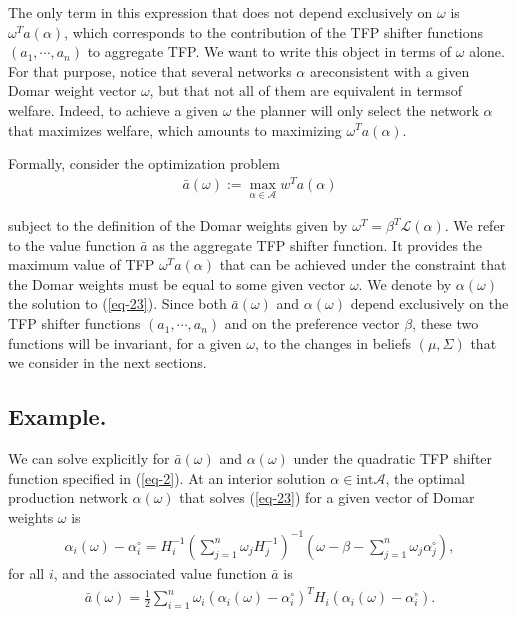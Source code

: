 \documentclass[11pt]{article}
\theoremstyle{definition}
\begin{document}
	The only term in this expression that does not depend exclusively on $\omega$ is $\omega^Ta(\alpha)$, which corresponds to the contribution of the TFP shifter functions $(a_1,\cdots,a_n)$ to aggregate TFP. We want to write this object in terms of $\omega$ alone. For that purpose, notice that several networks $\alpha$ areconsistent with a given Domar weight vector $\omega$, but that not all of them are equivalent in termsof welfare. Indeed, to achieve a given $\omega$ the planner will only select the network $\alpha$ that maximizes welfare, which amounts to maximizing $\omega^Ta(\alpha)$.
	
	Formally, consider the optimization problem
	\begin{align}
		\bar{a}(\omega) := \max\limits_{\alpha\in\mathcal{A}} w^Ta(\alpha) \label{eq-23}
	\end{align}
	
	subject to the definition of the Domar weights given by $\omega^T = \beta^T\mathcal{L}(\alpha)$. We refer to the value function $\bar{a}$ as the aggregate TFP shifter function. It provides the maximum value of TFP $\omega^Ta(\alpha)$ that can be achieved under the constraint that the Domar weights must be equal to some given vector $\omega$. We denote by $\alpha(\omega)$ the solution to (\ref{eq-23}). Since both $\bar{a}(\omega)$ and $\alpha(\omega)$ depend exclusively on the TFP shifter functions $(a_1,\cdots,a_n)$ and on the preference vector $\beta$, these two functions will be invariant, for a given $\omega$, to the changes in beliefs $(\mu, \Sigma)$ that we consider in the next sections.
	
	\subsection*{Example.} 
	We can solve explicitly for $\bar{a}(\omega)$ and $\alpha(\omega)$ under the quadratic TFP shifter function specified in (\ref{eq-2}). At an interior solution $\alpha\in \text{int} \mathcal{A}$, the optimal production network $\alpha(\omega)$ that solves (\ref{eq-23}) for a given vector of Domar weights $\omega$ is
	\begin{align}
		\alpha_i(\omega) - \alpha_i^{\circ} = H_i^{-1} \left(\sum\limits_{j=1}^n \omega_j H_j^{-1}\right)^{-1} \left(\omega - \beta - \sum\limits_{j=1}^n \omega_j \alpha_j^{\circ}\right), \label{eq-24}
	\end{align}
	for all $i$, and the associated value function $\bar{a}$ is
	\begin{align}
		\bar{a}(\omega) = \frac{1}{2}\sum\limits_{i=1}^n\omega_i(\alpha_i(\omega) - \alpha_i^{\circ})^T H_i (\alpha_i(\omega) - \alpha_i^{\circ}). \label{eq-25}
	\end{align}
	
\end{document}
